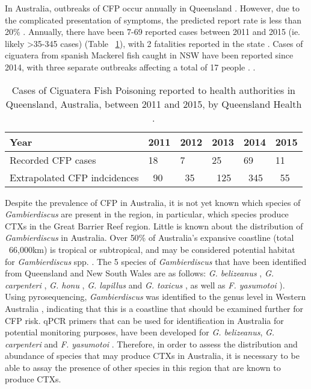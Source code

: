 \documentclass[12pt]{article}
\begin{document}
In Australia, outbreaks of CFP occur annually in Queensland \cite{qldcig}. However, due to the complicated presentation of symptoms, the predicted report rate is less than 20\% \citep{lewis2006ciguatera}. Annually, there have been 7-69 reported cases between 2011 and 2015 (ie. likely >35-345 cases) (Table ~\ref{tbl:CFPTable}), with 2 fatalities reported in the state \cite{tonge1967ciguatera}. Cases of ciguatera from spanish Mackerel fish caught in NSW have been reported since 2014, with three separate outbreaks affecting a total of 17 people \cite{farrellclinical}.
. %
\FloatBarrier
\begin{table}
\caption{Cases of Ciguatera Fish Poisoning reported to health authorities in Queensland, Australia, between 2011 and 2015, by Queensland Health \cite{qldcig}.}
\label{tbl:CFPTable}
\begin{tabular}{ | p{6cm} | p{1.5cm} | p{1.5cm}| p{1.5cm} | p{1.5cm} | p{1.5cm} | }
\hline
Year &2011&2012&2013&2014&2015\\
\hline
Recorded CFP cases&18&7&25&69&11\\
\hline
Extrapolated CFP indcidences&~90&~35&~125&~345&~55\\
\hline
\end{tabular}
\end{table}
\FloatBarrier
Despite the prevalence of CFP in Australia, it is not yet known which species of \textit{Gambierdiscus} are present in the region, in particular, which species produce CTXs in the Great Barrier Reef region. Little is known about the distribution of \emph{Gambierdiscus} in Australia.
Over 50\% of Australia's expansive coastline (total ~66,000km) is tropical or subtropical, and may be considered potential habitat for \emph{Gambierdiscus} spp. \cite{kretzschmar2016characterization}. 
The 5 species of \emph{Gambierdiscus} that have been identified from Queensland and New South Wales are as follows: \emph{G. belizeanus} \citep{murray2014molecular}, \emph{G. carpenteri} \citep{kohli2014high,sparrow2017effects}, \emph{G. honu} \cite{rhodes2017new}, \emph{G. lapillus} \cite{kretzschmar2016characterization} and \emph{G. toxicus} \citep{hallegraeff2010algae}, as well as \emph{F. yasumotoi}  \citep{murray2014molecular}). Using pyrosequencing, \textit{Gambierdiscus} was identified to the genus level in Western Australia \citep{kohli2014cob}, indicating that this is a coastline that should be examined further for CFP risk. 
qPCR primers that can be used for identification in Australia for potential monitoring purposes, have been developed for \emph{G. belizeanus}, \emph{G. carpenteri} and \emph{F. yasumotoi} \citep{nishimura2016quantitative,vandersea2012development}. Therefore, in order to assess the distribution and abundance of species that may produce CTXs in Australia, it is necessary to be able to assay the presence of other species in this region that are known to produce CTXs.\\ 
\end{document}
